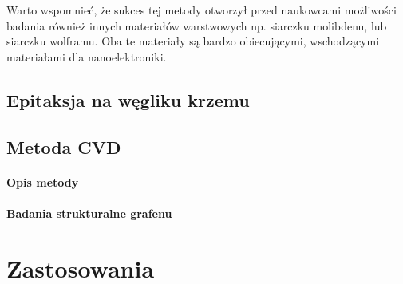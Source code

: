 	Warto wspomnieć, że sukces tej metody otworzył przed naukowcami możliwości badania również innych 
	materiałów warstwowych np. siarczku molibdenu, lub siarczku wolframu. Oba te materiały są bardzo
	obiecującymi, wschodzącymi materiałami dla nanoelektroniki.


	\subsection{Epitaksja na węgliku krzemu}

	\subsection{Metoda CVD}
	
		\paragraph{Opis metody}
		\paragraph{Badania strukturalne grafenu}
	\section{Zastosowania}
